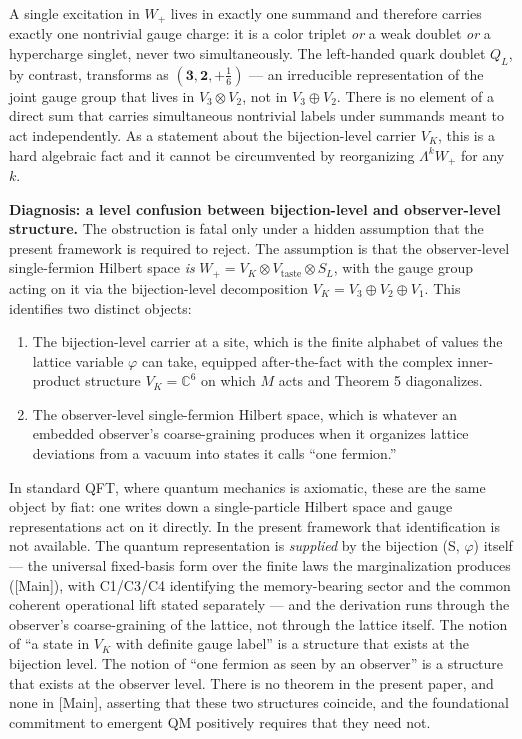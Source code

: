 \documentclass[
]{article}
\begin{document}
A single excitation in \(W_+\) lives in exactly one summand and
therefore carries exactly one nontrivial gauge charge: it is a color
triplet \emph{or} a weak doublet \emph{or} a hypercharge singlet, never
two simultaneously. The left-handed quark doublet \(Q_L\), by contrast,
transforms as \((\mathbf{3}, \mathbf{2}, +\tfrac{1}{6})\) --- an
irreducible representation of the joint gauge group that lives in
\(V_3 \otimes V_2\), not in \(V_3 \oplus V_2\). There is no element of a
direct sum that carries simultaneous nontrivial labels under summands
meant to act independently. As a statement about the bijection-level
carrier \(V_K\), this is a hard algebraic fact and it cannot be
circumvented by reorganizing \(\Lambda^k W_+\) for any \(k\).

\textbf{Diagnosis: a level confusion between bijection-level and
observer-level structure.} The obstruction is fatal only under a hidden
assumption that the present framework is required to reject. The
assumption is that the observer-level single-fermion Hilbert space
\emph{is} \(W_+ = V_K \otimes V_{\text{taste}} \otimes S_L\), with the
gauge group acting on it via the bijection-level decomposition
\(V_K = V_3 \oplus V_2 \oplus V_1\). This identifies two distinct
objects:

\begin{enumerate}
\def\labelenumi{\arabic{enumi}.}
\item
  The bijection-level carrier at a site, which is the finite alphabet of
  values the lattice variable \(\varphi\) can take, equipped
  after-the-fact with the complex inner-product structure
  \(V_K = \mathbb{C}^6\) on which \(M\) acts and Theorem 5 diagonalizes.
\item
  The observer-level single-fermion Hilbert space, which is whatever an
  embedded observer's coarse-graining produces when it organizes lattice
  deviations from a vacuum into states it calls ``one fermion.''
\end{enumerate}

In standard QFT, where quantum mechanics is axiomatic, these are the
same object by fiat: one writes down a single-particle Hilbert space and
gauge representations act on it directly. In the present framework that
identification is not available. The quantum representation is
\emph{supplied} by the bijection (S, \(\varphi\)) itself --- the
universal fixed-basis form over the finite laws the marginalization
produces ({[}Main{]}), with C1/C3/C4 identifying the memory-bearing
sector and the common coherent operational lift stated separately ---
and the derivation runs through the observer's coarse-graining of the
lattice, not through the lattice itself. The notion of ``a state in
\(V_K\) with definite gauge label'' is a structure that exists at the
bijection level. The notion of ``one fermion as seen by an observer'' is
a structure that exists at the observer level. There is no theorem in
the present paper, and none in {[}Main{]}, asserting that these two
structures coincide, and the foundational commitment to emergent QM
positively requires that they need not.
\end{document}
